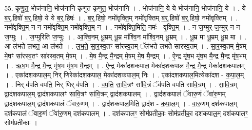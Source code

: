 \documentclass[17pt]{extarticle}
\begin{document}
55. कृ॒णु॒त॒ भोज॑नानि॒ भोज॑नानि कृणुत कृणुत॒ भोज॑नानि । . भोज॑नानि॒ ये ये भोज॑नानि॒ भोज॑नानि॒ ये । . ये ब॒र्॒.हिषो॑ ब॒र्॒.हिषो॒ ये ये ब॒र्॒.हिषः॑ । . ब॒र्॒.हिषो॒ नमो॑वृक्ति॒म् नमो॑वृक्तिम् ब॒र्॒.हिषो॑ ब॒र्॒.हिषो॒ नमो॑वृक्तिम् । . नमो॑वृक्ति॒म् न न नमो॑वृक्ति॒म् नमो॑वृक्ति॒म् न । . नमो॑वृक्ति॒मिति॒ नमः॑ - वृ॒क्ति॒म् । . न ज॒ग्मुर् ज॒ग्मुर् न न ज॒ग्मुः । . ज॒ग्मुरिति॑ ज॒ग्मुः । . आ॒श्वि॒नम् धू॒म्रम् धू॒म्र मा᳚श्वि॒न मा᳚श्वि॒नम् धू॒म्रम् । . धू॒म्र मा धू॒म्रम् धू॒म्र मा । . आ ल॑भते लभत॒ आ ल॑भते । . ल॒भ॒ते॒ सा॒र॒स्व॒तꣳ सा॑रस्व॒तम् ॅल॑भते लभते सारस्व॒तम् । . सा॒र॒स्व॒तम् मे॒षम् मे॒षꣳ सा॑रस्व॒तꣳ सा॑रस्व॒तम् मे॒षम् । . मे॒ष मै॒न्द्र मै॒न्द्रम् मे॒षम् मे॒ष मै॒न्द्रम् । . ऐ॒न्द्र मृ॑ष॒भ मृ॑ष॒भ मै॒न्द्र मै॒न्द्र मृ॑ष॒भम् । . ऋ॒ष॒भ मै॒न्द्र मै॒न्द्र मृ॑ष॒भ मृ॑ष॒भ मै॒न्द्रम् । . ऐ॒न्द्र मेका॑दशकपाल॒ मेका॑दशकपाल मै॒न्द्र मै॒न्द्र मेका॑दशकपालम् । . एका॑दशकपाल॒म् निर् णिरेका॑दशकपाल॒ मेका॑दशकपाल॒म् निः । . एका॑दशकपाल॒मित्येका॑दश - क॒पा॒ल॒म् । . निर् व॑पति वपति॒ निर् णिर् व॑पति । . व॒प॒ति॒ सा॒वि॒त्रꣳ सा॑वि॒त्रं ॅव॑पति वपति सावि॒त्रम् । . सा॒वि॒त्रम् द्वाद॑शकपाल॒म् द्वाद॑शकपालꣳ सावि॒त्रꣳ सा॑वि॒त्रम् द्वाद॑शकपालम् । . द्वाद॑शकपालं ॅवारु॒णं ॅवा॑रु॒णम् द्वाद॑शकपाल॒म् द्वाद॑शकपालं ॅवारु॒णम् । . द्वाद॑शकपाल॒मिति॒ द्वाद॑श - क॒पा॒ल॒म् । . वा॒रु॒णम् दश॑कपाल॒म् दश॑कपालं ॅवारु॒णं ॅवा॑रु॒णम् दश॑कपालम् । . दश॑कपालꣳ॒॒ सोम॑प्रतीकाः॒ सोम॑प्रतीका॒ दश॑कपाल॒म् दश॑कपालꣳ॒॒ सोम॑प्रतीकाः । \newline
\end{document}
